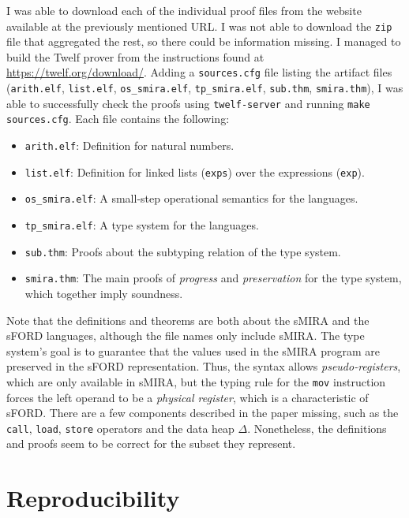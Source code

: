 \documentclass[]{NobArticle}
\begin{document}
I was able to download each of the individual proof files from the website available at the previously mentioned URL. I was not able to download the \texttt{zip} file that aggregated the rest, so there could be information missing. I managed to build the Twelf prover from the instructions found at \url{https://twelf.org/download/}. Adding a \texttt{sources.cfg} file listing the artifact files (\texttt{arith.elf}, \texttt{list.elf}, \texttt{os\_smira.elf}, \texttt{tp\_smira.elf}, \texttt{sub.thm}, \texttt{smira.thm}), I was able to successfully check the proofs using \texttt{twelf-server} and running \texttt{make sources.cfg}. Each file contains the following:
\begin{itemize}
  \item \verb|arith.elf|: Definition for natural numbers.
  \item \verb|list.elf|: Definition for linked lists (\verb|exps|) over the expressions (\verb|exp|).
  \item \verb|os_smira.elf|: A small-step operational semantics for the languages.
  \item \verb|tp_smira.elf|: A type system for the languages.
  \item \verb|sub.thm|: Proofs about the subtyping relation of the type system.
  \item \verb|smira.thm|: The main proofs of \textit{progress} and \textit{preservation} for the type system, which together imply soundness.
\end{itemize}

Note that the definitions and theorems are both about the sMIRA and the sFORD languages, although the file names only include sMIRA. The type system's goal is to guarantee that the values used in the sMIRA program are preserved in the sFORD representation. Thus, the syntax allows \textit{pseudo-registers}, which are only available in sMIRA, but the typing rule for the \verb|mov| instruction forces the left operand to be a \textit{physical register}, which is a characteristic of sFORD. There are a few components described in the paper missing, such as the \verb|call|, \verb|load|, \verb|store| operators and the data heap $\Delta$. Nonetheless, the definitions and proofs seem to be correct for the subset they represent.

\section{Reproducibility}
\end{document}
